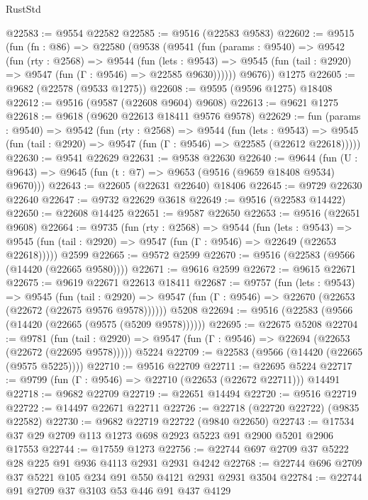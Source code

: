 \begin{lexlean}{RustStd}
\begin{coremodule}
@22583 := @9554 @22582
@22585 := @9516 (@22583 @9583)
@22602 := @9515
    (fun (fn : @86) =>
    @22580
      (@9538
        (@9541
          (fun (params : @9540) =>
          @9542
            (fun (rty : @2568) =>
            @9544
              (fun (lets : @9543) =>
              @9545 (fun (tail : @2920) => @9547 (fun (Γ : @9546) => @22585 @9630))))))
        @9676))
    @1275
@22605 := @9682 (@22578 (@9533 @1275))
@22608 := @9595 (@9596 @1275) @18408
@22612 := @9516 (@9587 (@22608 @9604) @9608)
@22613 := @9621 @1275
@22618 := @9618 (@9620 @22613 @18411 @9576 @9578)
@22629 := fun (params : @9540) =>
  @9542
    (fun (rty : @2568) =>
    @9544
      (fun (lets : @9543) =>
      @9545 (fun (tail : @2920) => @9547 (fun (Γ : @9546) => @22585 (@22612 @22618)))))
@22630 := @9541 @22629
@22631 := @9538 @22630
@22640 := @9644
    (fun (U : @9643) => @9645 (fun (t : @7) => @9653 (@9516 (@9659 @18408 @9534) @9670)))
@22643 := @22605 (@22631 @22640) @18406
@22645 := @9729 @22630 @22640
@22647 := @9732 @22629 @3618
@22649 := @9516 (@22583 @14422)
@22650 := @22608 @14425
@22651 := @9587 @22650
@22653 := @9516 (@22651 @9608)
@22664 := @9735
    (fun (rty : @2568) =>
    @9544
      (fun (lets : @9543) =>
      @9545 (fun (tail : @2920) => @9547 (fun (Γ : @9546) => @22649 (@22653 @22618)))))
    @2599
@22665 := @9572 @2599
@22670 := @9516 (@22583 (@9566 (@14420 (@22665 @9580))))
@22671 := @9616 @2599
@22672 := @9615 @22671
@22675 := @9619 @22671 @22613 @18411
@22687 := @9757
    (fun (lets : @9543) =>
    @9545
      (fun (tail : @2920) =>
      @9547 (fun (Γ : @9546) => @22670 (@22653 (@22672 (@22675 @9576 @9578))))))
    @5208
@22694 := @9516 (@22583 (@9566 (@14420 (@22665 (@9575 (@5209 @9578))))))
@22695 := @22675 @5208
@22704 := @9781
    (fun (tail : @2920) => @9547 (fun (Γ : @9546) => @22694 (@22653 (@22672 (@22695 @9578)))))
    @5224
@22709 := @22583 (@9566 (@14420 (@22665 (@9575 @5225))))
@22710 := @9516 @22709
@22711 := @22695 @5224
@22717 := @9799 (fun (Γ : @9546) => @22710 (@22653 (@22672 @22711))) @14491
@22718 := @9682 @22709
@22719 := @22651 @14494
@22720 := @9516 @22719
@22722 := @14497 @22671 @22711
@22726 := @22718 (@22720 @22722) (@9835 @22582)
@22730 := @9682 @22719 @22722 (@9840 @22650)
@22743 := @17534 @37 @29 @2709 @113 @1273 @698 @2923 @5223 @91 @2900 @5201 @2906 @17553
@22744 := @17559 @1273
@22756 := @22744 @697 @2709 @37 @5222 @28 @225 @91 @936 @4113 @2931 @2931 @4242
@22768 := @22744 @696 @2709 @37 @5221 @105 @234 @91 @550 @4121 @2931 @2931 @3504
@22784 := @22744
    @91
    @2709
    @37
    @3103
    @53
    @446
    @91
    @437
    @4129

\end{coremodule}
\end{lexlean}
